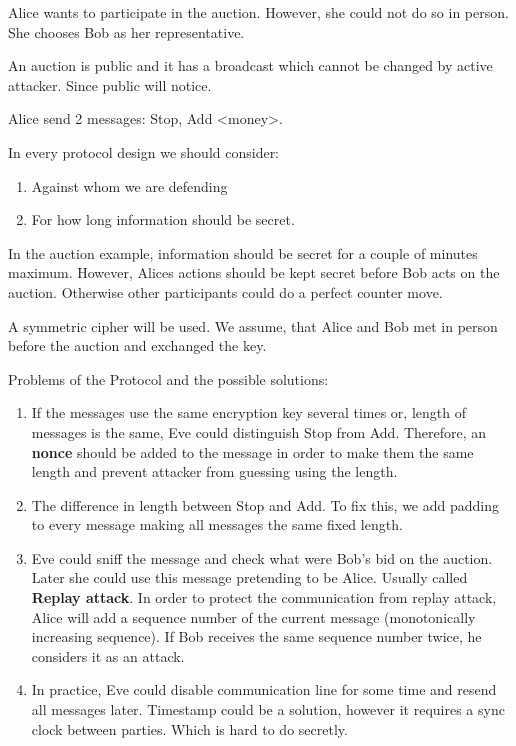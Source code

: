 \begin{example}
	Alice wants to participate in the auction. However, she could not do so in person. She chooses Bob as her representative.

	An auction is public and it has a broadcast which cannot be changed by active attacker. Since public will notice.

	Alice send 2 messages: Stop, Add <money>.

	In every protocol design we should consider:
	\begin{enumerate}
		\item Against whom we are defending
		\item For how long information should be secret.
	\end{enumerate}

	In the auction example, information should be secret for a couple of minutes maximum.
	However, Alices actions should be kept secret before Bob acts on the auction. Otherwise other participants could do a perfect counter move.

	A symmetric cipher will be used. We assume, that Alice and Bob met in person before the auction and exchanged the key.

	Problems of the Protocol and the possible solutions:
\begin{enumerate}

	\item If the messages use the same encryption key several times or, length of messages is the same, Eve could distinguish Stop from Add.
	Therefore, an \textbf{nonce} should be added to the message in order to make them the same length and prevent attacker from guessing using the length.

	\item The difference in length between Stop and Add. To fix this, we add padding to every message making all messages the same fixed length.

	\item Eve could sniff the message and check what were Bob's bid on the auction. Later she could use this message pretending to be Alice. Usually called \textbf{Replay attack}.
	In order to protect the communication from replay attack, Alice will add a sequence number of the current message (monotonically increasing sequence).
	If Bob receives the same sequence number twice, he considers it as an attack.

	\item In practice, Eve could disable communication line for some time and resend all messages later. Timestamp could be a solution, however it requires a sync clock between parties. Which is hard to do secretly.


\end{enumerate}
\end{example}
